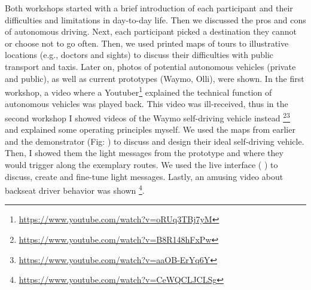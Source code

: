 Both workshops started with a brief introduction of each participant and their difficulties and limitations in day-to-day life. Then we discussed the pros and cons of autonomous driving. Next, each participant picked a destination they cannot or choose not to go often. Then, we used printed maps of tours to illustrative locations (e.g., doctors and sights) to discuss their difficulties with public transport and taxis. Later on, photos of potential autonomous vehicles (private and public), as well as current prototypes (Waymo, Olli), were shown. In the first workshop, a video where a Youtuber\footnote{\url{https://www.youtube.com/watch?v=oRUq3TBj7yM}} explained the technical function of autonomous vehicles was played back. This video was ill-received, thus in the second workshop I showed videos of the Waymo self-driving vehicle instead \footnote{\url{https://www.youtube.com/watch?v=B8R148hFxPw}}\fnsep\footnote{\url{https://www.youtube.com/watch?v=aaOB-ErYq6Y}}  and explained some operating principles myself. We used the maps from earlier and the demonstrator (Fig: \emph{}) to discuss and design their ideal self-driving vehicle. Then, I showed them the light messages from the prototype and where they would trigger along the exemplary routes. We used the live interface ( \emph{}) to discuss, create and fine-tune light messages. Lastly, an amusing video about backseat driver behavior was shown \footnote{\url{https://www.youtube.com/watch?v=CeWQCLJCLSg}}. 

